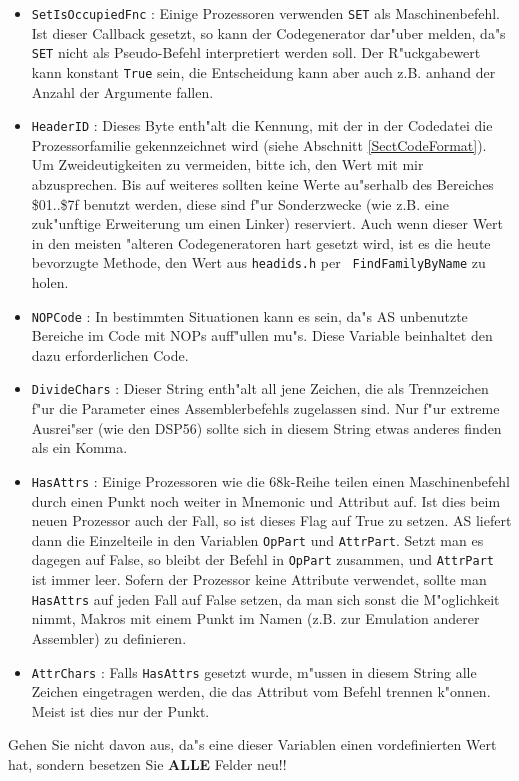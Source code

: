 \documentclass[12pt,a4paper,twoside]{report}
\newcommand{\bb}[1]{{\bf #1}}
\newcommand{\tty}[1]{{\tt #1}}
\newcommand{\asname}{AS}
\begin{document}
\begin{itemize}
{      sollte und eines der Elemente von \tty{ListGrans} ungleich eins ist,
      sollte dieses Flag auf True gesetzt werden, um korrekte Code-Dateien
      zu erhalten.}
\item{\tty{SetIsOccupiedFnc} : Einige Prozessoren verwenden \tty{SET} als
      Maschinenbefehl.  Ist dieser Callback gesetzt, so kann der Codegenerator
      dar"uber melden, da"s \tty{SET} nicht als Pseudo-Befehl interpretiert
      werden soll.  Der R"uckgabewert kann konstant \tty{True} sein, die
      Entscheidung kann aber auch z.B. anhand der Anzahl der Argumente fallen.}
\item{\tty{HeaderID} : Dieses Byte enth"alt die Kennung, mit der in der Codedatei
      die Prozessorfamilie gekennzeichnet wird (siehe Abschnitt
      \ref{SectCodeFormat}).  Um Zweideutigkeiten zu vermeiden,
      bitte ich, den Wert mit mir abzusprechen.  Bis auf weiteres sollten
      keine Werte au"serhalb des Bereiches \$01..\$7f benutzt werden,
      diese sind f"ur Sonderzwecke (wie z.B. eine zuk"unftige Erweiterung
      um einen Linker) reserviert.  Auch wenn dieser Wert in den meisten
      "alteren Codegeneratoren hart gesetzt wird, ist es die heute
      bevorzugte Methode, den Wert aus {\tt headids.h} per {\tt
      FindFamilyByName} zu holen.}
\item{\tty{NOPCode} : In bestimmten Situationen kann es sein, da"s \asname{} unbenutzte
      Bereiche im Code mit NOPs auff"ullen mu"s.  Diese Variable beinhaltet
      den dazu erforderlichen Code.}
\item{\tty{DivideChars} : Dieser String enth"alt all jene Zeichen, die als
      Trennzeichen f"ur die Parameter eines Assemblerbefehls zugelassen
      sind.  Nur f"ur extreme Ausrei"ser (wie den DSP56) sollte sich in
      diesem String etwas anderes finden als ein Komma.}
\item{\tty{HasAttrs} : Einige Prozessoren wie die 68k-Reihe teilen einen
      Maschinenbefehl durch einen Punkt noch weiter in Mnemonic und
      Attribut auf.  Ist dies beim neuen Prozessor auch der Fall, so
      ist dieses Flag auf True zu setzen.  \asname{} liefert dann die Einzelteile
      in den Variablen \tty{OpPart} und \tty{AttrPart}.  Setzt man es
      dagegen auf False, so bleibt der Befehl in \tty{OpPart} zusammen,
      und \tty{AttrPart} ist immer leer.  Sofern der Prozessor keine
      Attribute verwendet, sollte man \tty{HasAttrs} auf jeden Fall auf False
      setzen, da man sich sonst die M"oglichkeit nimmt, Makros mit einem
      Punkt im Namen (z.B. zur Emulation anderer Assembler) zu definieren.}
\item{\tty{AttrChars} : Falls \tty{HasAttrs} gesetzt wurde, m"ussen in diesem
      String alle Zeichen eingetragen werden, die das Attribut vom Befehl
      trennen k"onnen.  Meist ist dies nur der Punkt.}
\end{itemize}
Gehen Sie nicht davon aus, da"s eine dieser Variablen einen vordefinierten
Wert hat, sondern besetzen Sie \bb{ALLE} Felder neu!!
\end{document}
